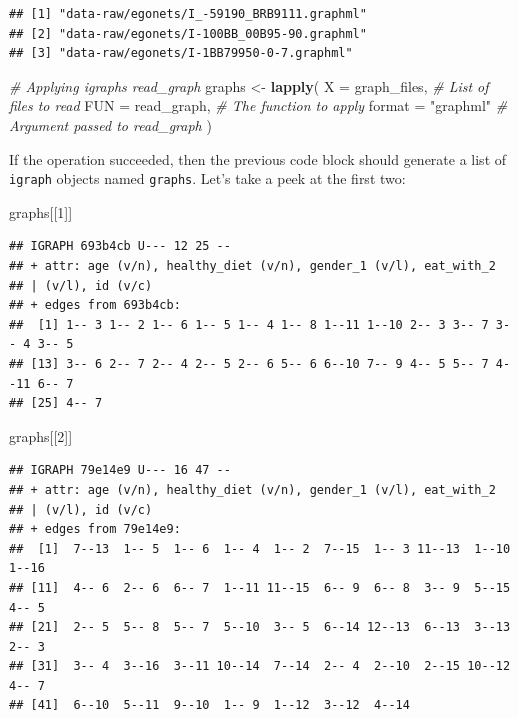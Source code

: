 \documentclass[
]{book}
\newenvironment{Shaded}{\begin{snugshade}}{\end{snugshade}}
\newcommand{\AttributeTok}[1]{\textcolor[rgb]{0.13,0.29,0.53}{#1}}
\newcommand{\CommentTok}[1]{\textcolor[rgb]{0.56,0.35,0.01}{\textit{#1}}}
\newcommand{\DecValTok}[1]{\textcolor[rgb]{0.00,0.00,0.81}{#1}}
\newcommand{\FunctionTok}[1]{\textcolor[rgb]{0.13,0.29,0.53}{\textbf{#1}}}
\newcommand{\NormalTok}[1]{#1}
\newcommand{\OtherTok}[1]{\textcolor[rgb]{0.56,0.35,0.01}{#1}}
\newcommand{\StringTok}[1]{\textcolor[rgb]{0.31,0.60,0.02}{#1}}
\begin{document}
\begin{verbatim}
## [1] "data-raw/egonets/I_-59190_BRB9111.graphml"
## [2] "data-raw/egonets/I-100BB_00B95-90.graphml"
## [3] "data-raw/egonets/I-1BB79950-0-7.graphml"
\end{verbatim}

\begin{Shaded}
\begin{Highlighting}[]
\CommentTok{\# Applying igraph\textquotesingle{}s read\_graph}
\NormalTok{graphs }\OtherTok{\textless{}{-}} \FunctionTok{lapply}\NormalTok{(}
  \AttributeTok{X      =}\NormalTok{ graph\_files,       }\CommentTok{\# List of files to read}
  \AttributeTok{FUN    =}\NormalTok{ read\_graph,        }\CommentTok{\# The function to apply}
  \AttributeTok{format =} \StringTok{"graphml"}          \CommentTok{\# Argument passed to read\_graph}
\NormalTok{  )}
\end{Highlighting}
\end{Shaded}

If the operation succeeded, then the previous code block should generate a list of \texttt{igraph} objects named \texttt{graphs}. Let's take a peek at the first two:

\begin{Shaded}
\begin{Highlighting}[]
\NormalTok{graphs[[}\DecValTok{1}\NormalTok{]]}
\end{Highlighting}
\end{Shaded}

\begin{verbatim}
## IGRAPH 693b4cb U--- 12 25 -- 
## + attr: age (v/n), healthy_diet (v/n), gender_1 (v/l), eat_with_2
## | (v/l), id (v/c)
## + edges from 693b4cb:
##  [1] 1-- 3 1-- 2 1-- 6 1-- 5 1-- 4 1-- 8 1--11 1--10 2-- 3 3-- 7 3-- 4 3-- 5
## [13] 3-- 6 2-- 7 2-- 4 2-- 5 2-- 6 5-- 6 6--10 7-- 9 4-- 5 5-- 7 4--11 6-- 7
## [25] 4-- 7
\end{verbatim}

\begin{Shaded}
\begin{Highlighting}[]
\NormalTok{graphs[[}\DecValTok{2}\NormalTok{]]}
\end{Highlighting}
\end{Shaded}

\begin{verbatim}
## IGRAPH 79e14e9 U--- 16 47 -- 
## + attr: age (v/n), healthy_diet (v/n), gender_1 (v/l), eat_with_2
## | (v/l), id (v/c)
## + edges from 79e14e9:
##  [1]  7--13  1-- 5  1-- 6  1-- 4  1-- 2  7--15  1-- 3 11--13  1--10  1--16
## [11]  4-- 6  2-- 6  6-- 7  1--11 11--15  6-- 9  6-- 8  3-- 9  5--15  4-- 5
## [21]  2-- 5  5-- 8  5-- 7  5--10  3-- 5  6--14 12--13  6--13  3--13  2-- 3
## [31]  3-- 4  3--16  3--11 10--14  7--14  2-- 4  2--10  2--15 10--12  4-- 7
## [41]  6--10  5--11  9--10  1-- 9  1--12  3--12  4--14
\end{verbatim}
\end{document}
